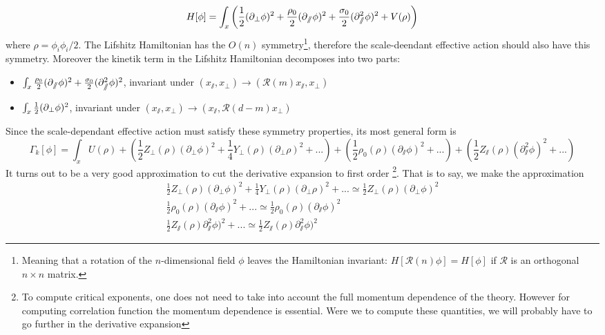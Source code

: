 \begin{equation}
H[\phi] = \int_x \left( \frac{1}{2}(\partial_{\perp} \phi)^2 + \frac{\rho_0}{2}(\partial_{\sslash} \phi)^2 + \frac{\sigma_0}{2} (\partial_{\sslash}^2 \phi)^2 + V(\rho) \right)
\end{equation}
where $\rho = \phi_i \phi_i/2$. 
The Lifshitz Hamiltonian has the $O(n)$ symmetry\footnote{Meaning that a rotation of the $n$-dimensional field $\phi$ leaves the Hamiltonian invariant: $H[\mathcal{R}(n)\phi] = H[\phi]$ if $\mathcal{R}$ is an orthogonal $n \times n$ matrix.}, therefore the scale-deendant effective action should also have this symmetry. Moreover the kinetik term in the Lifshitz Hamiltonian decomposes into two parts:
\begin{itemize}
\item $\int_{x} \frac{\rho_0}{2}(\partial_{\sslash} \phi)^2 + \frac{\sigma_0}{2} (\partial_{\sslash}^2 \phi)^2$, invariant under $\left(x_\sslash,x_\perp \right) \rightarrow \left(\mathcal{R}(m) x_\sslash, x_\perp\right)$
\item $\int_{x} \frac{1}{2}(\partial_{\perp} \phi)^2$, invariant under $\left(x_\sslash,x_\perp \right) \rightarrow \left(x_\sslash, \mathcal{R}(d-m) x_\perp\right)$
\end{itemize}
Since the scale-dependant effective action must satisfy these symmetry properties, its most general form is
\begin{equation}
\Gamma_k[\phi] = \int_{x} U(\rho) + \left( \frac{1}{2} Z_\perp(\rho) (\partial_\perp \phi)^2 + \frac{1}{4} Y_\perp(\rho) (\partial_\perp \rho)^2 + ... \right) + \left( \frac{1}{2} \rho_0(\rho) (\partial_\sslash \phi)^2 + ... \right) + \left( \frac{1}{2} Z_\sslash(\rho) (\partial_\sslash^2 \phi)^2 + ... \right)
\end{equation}
It turns out to be a very good approximation to cut the derivative expansion to first order \footnote{To compute critical exponents, one does not need to take into account the full momentum dependence of the theory. However for computing correlation function the momentum dependence is essential. Were we to compute these quantities, we will probably have to go further in the derivative expansion}. That is to say, we make the approximation
\begin{eqnarray}
\frac{1}{2} Z_\perp(\rho) (\partial_\perp \phi)^2 + \frac{1}{4} Y_\perp(\rho) (\partial_\perp \rho)^2 + ...  \simeq  \frac{1}{2} Z_\perp(\rho) (\partial_\perp \phi)^2  \\
 \frac{1}{2} \rho_0(\rho) (\partial_\sslash \phi)^2 + ...  \simeq  \frac{1}{2} \rho_0(\rho) (\partial_\sslash \phi)^2 \\
\frac{1}{2} Z_\sslash(\rho) \partial_\sslash^2 \phi)^2 + ... \simeq \frac{1}{2} Z_\sslash(\rho) \partial_\sslash^2 \phi)^2
\end{eqnarray}
